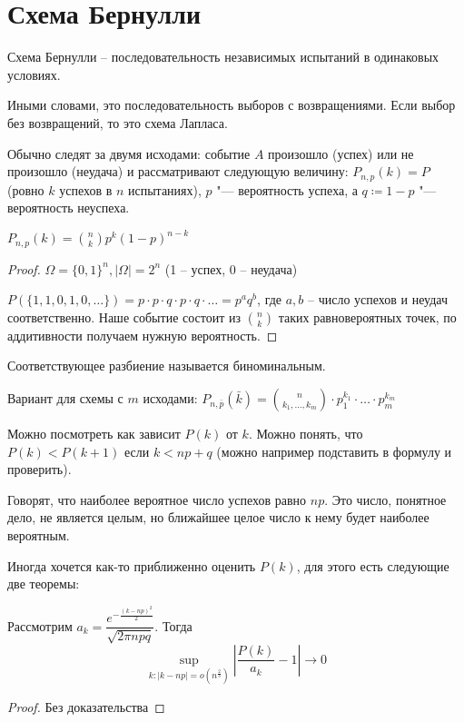 \section{Схема Бернулли}

\begin{Def}
Схема Бернулли -- последовательность независимых испытаний в одинаковых условиях.    
\end{Def}

\begin{Rem}
Иными словами, это последовательность выборов с возвращениями.
Если выбор без возвращений, то это схема Лапласа.
\end{Rem}

Обычно следят за двумя исходами: событие $A$ произошло (успех) или не произошло (неудача) и рассматривают следующую величину:
$P_{n,p}(k) = P$(ровно $k$ успехов в $n$ испытаниях), $p$ "--- вероятность успеха, а $q \coloneq 1-p$ "--- вероятность неуспеха.

\begin{theorem}
    $P_{n,p}(k) = {n \choose k} p^k (1-p)^{n-k}$
\end{theorem}
\begin{proof}
    $\Omega = \{0, 1\}^n, |\Omega| = 2^n$ (1 -- успех, 0 -- неудача)

    $P(\{1, 1, 0, 1, 0, \dots \}) = p \cdot p \cdot q \cdot p \cdot q \cdot \dots = p^{a}q^{b}$, где $a, b$ -- число успехов и неудач соответственно.
    Наше событие состоит из ${n \choose k}$ таких равновероятных точек, по аддитивности получаем нужную вероятность.
\end{proof}                                                                  

\begin{Def}
Соответствующее разбиение называется биноминальным.
\end{Def}

Вариант для схемы с $m$ исходами: $P_{n, \bar p}(\bar k) = \binom{n}{k_1, \dots, k_m} \cdot p_1^{k_1} \cdot \dots \cdot p_m^{k_m}$


Можно посмотреть как зависит $P(k)$ от $k$. Можно понять, что $P(k) < P(k + 1)$ если $k < np + q$ (можно например подставить в формулу и проверить).

Говорят, что наиболее вероятное число успехов равно $np$. Это число, понятное дело, не является целым, но ближайшее целое число к нему будет наиболее вероятным.

Иногда хочется как-то приближенно оценить $P(k)$, для этого есть следующие две теоремы:
\begin{theorem}
Рассмотрим $a_k = \dfrac{e^{-\frac{(k - np)^2}{2}}}{\sqrt{2\pi npq}}$. Тогда
$$\sup_{k\colon |k - np| = o(n^{\frac23})} |\frac{P(k)}{a_k} - 1| \to 0$$
\end{theorem}
\begin{proof}
Без доказательства
\end{proof}
